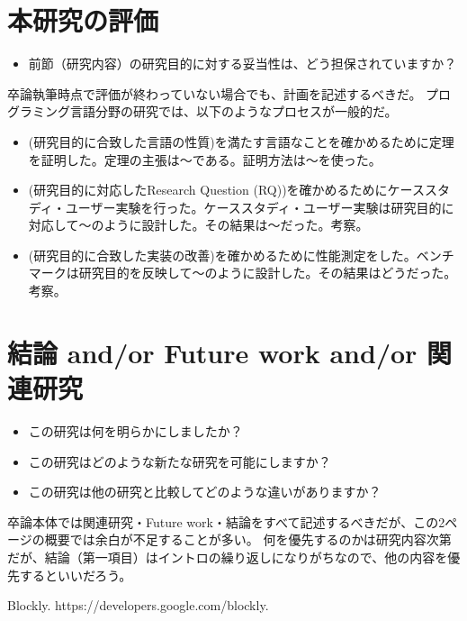 \documentclass[11pt, a4paper, oneside, twocolumn]{jsarticle}
\begin{document}
\section{本研究の評価}
\begin{itemize}
\item 前節（研究内容）の研究目的に対する妥当性は、どう担保されていますか？
\end{itemize}
卒論執筆時点で評価が終わっていない場合でも、計画を記述するべきだ。
プログラミング言語分野の研究では、以下のようなプロセスが一般的だ。
\begin{itemize}
\item (研究目的に合致した言語の性質)を満たす言語なことを確かめるために定理を証明した。定理の主張は〜である。証明方法は〜を使った。
\item (研究目的に対応したResearch Question (RQ))を確かめるためにケーススタディ・ユーザー実験を行った。ケーススタディ・ユーザー実験は研究目的に対応して〜のように設計した。その結果は〜だった。考察。
\item (研究目的に合致した実装の改善)を確かめるために性能測定をした。ベンチマークは研究目的を反映して〜のように設計した。その結果はどうだった。考察。
\end{itemize}

\section{結論 and/or Future work and/or 関連研究}
\begin{itemize}
\item この研究は何を明らかにしましたか？
\item この研究はどのような新たな研究を可能にしますか？
\item この研究は他の研究と比較してどのような違いがありますか？
\end{itemize}
卒論本体では関連研究・Future work・結論をすべて記述するべきだが、この2ページの概要では余白が不足することが多い。
何を優先するのかは研究内容次第だが、結論（第一項目）はイントロの繰り返しになりがちなので、他の内容を優先するといいだろう。

{\scriptsize
\begin{thebibliography}{1} 
  Blockly. https://developers.google.com/blockly.
\end{thebibliography}
}
\end{document}
